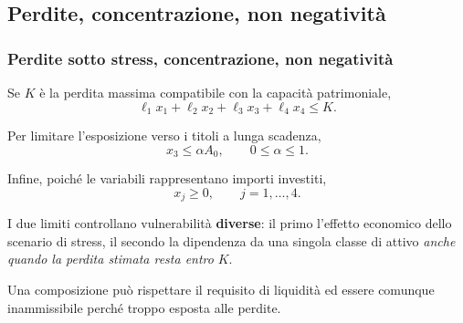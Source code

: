 



\subsection{Perdite, concentrazione, non negativit\`{a}}%

\begin{frame}%
%

\frametitle{Perdite sotto stress, concentrazione, non negativit\`{a}}%
%

%


Se $K$ \`{e} la perdita massima compatibile con la capacit\`{a} patrimoniale,
\[
\ell_{1}x_{1}+\ell_{2}x_{2}+\ell_{3}x_{3}+\ell_{4}x_{4}\leq K.
\]


Per limitare l'esposizione verso i titoli a lunga scadenza,
\[
x_{3}\leq\alpha A_{0}, \qquad0\leq\alpha\leq1.
\]


\smallskip

Infine, poich\'{e} le variabili rappresentano importi investiti,
\[
x_{j}\geq0, \qquad j=1,\ldots,4.
\]


\medskip

\begin{stepitemize}
\item I due limiti controllano vulnerabilit\`{a} \textbf{diverse}: il primo
l'effetto economico dello scenario di stress, il secondo la dipendenza da una
singola classe di attivo \emph{anche quando la perdita stimata resta entro}
$K$.

\item Una composizione pu\`{o} rispettare il requisito di liquidit\`{a} ed
essere comunque inammissibile perch\'{e} troppo esposta alle perdite.
\end{stepitemize}

%

\transboxout
\end{frame}%


